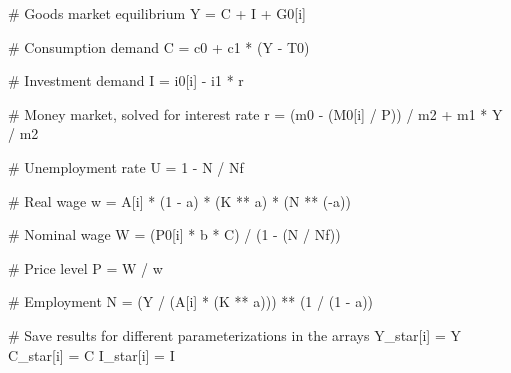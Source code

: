\documentclass[
  letterpaper,
  DIV=11,
  numbers=noendperiod]{scrreprt}
\newenvironment{Shaded}{\begin{snugshade}}{\end{snugshade}}
\newcommand{\CommentTok}[1]{\textcolor[rgb]{0.37,0.37,0.37}{#1}}
\newcommand{\DecValTok}[1]{\textcolor[rgb]{0.68,0.00,0.00}{#1}}
\newcommand{\NormalTok}[1]{\textcolor[rgb]{0.00,0.23,0.31}{#1}}
\newcommand{\OperatorTok}[1]{\textcolor[rgb]{0.37,0.37,0.37}{#1}}
\begin{document}
\begin{tcolorbox}
\begin{Shaded}
\begin{Highlighting}[]
        \CommentTok{\# Goods market equilibrium}
\NormalTok{        Y }\OperatorTok{=}\NormalTok{ C }\OperatorTok{+}\NormalTok{ I }\OperatorTok{+}\NormalTok{ G0[i]}

        \CommentTok{\# Consumption demand}
\NormalTok{        C }\OperatorTok{=}\NormalTok{ c0 }\OperatorTok{+}\NormalTok{ c1 }\OperatorTok{*}\NormalTok{ (Y }\OperatorTok{{-}}\NormalTok{ T0)}

        \CommentTok{\# Investment demand}
\NormalTok{        I }\OperatorTok{=}\NormalTok{ i0[i] }\OperatorTok{{-}}\NormalTok{ i1 }\OperatorTok{*}\NormalTok{ r}

        \CommentTok{\# Money market, solved for interest rate}
\NormalTok{        r }\OperatorTok{=}\NormalTok{ (m0 }\OperatorTok{{-}}\NormalTok{ (M0[i] }\OperatorTok{/}\NormalTok{ P)) }\OperatorTok{/}\NormalTok{ m2 }\OperatorTok{+}\NormalTok{ m1 }\OperatorTok{*}\NormalTok{ Y }\OperatorTok{/}\NormalTok{ m2}

        \CommentTok{\# Unemployment rate}
\NormalTok{        U }\OperatorTok{=} \DecValTok{1} \OperatorTok{{-}}\NormalTok{ N }\OperatorTok{/}\NormalTok{ Nf}

        \CommentTok{\# Real wage}
\NormalTok{        w }\OperatorTok{=}\NormalTok{ A[i] }\OperatorTok{*}\NormalTok{ (}\DecValTok{1} \OperatorTok{{-}}\NormalTok{ a) }\OperatorTok{*}\NormalTok{ (K }\OperatorTok{**}\NormalTok{ a) }\OperatorTok{*}\NormalTok{ (N }\OperatorTok{**}\NormalTok{ (}\OperatorTok{{-}}\NormalTok{a))}

        \CommentTok{\# Nominal wage}
\NormalTok{        W }\OperatorTok{=}\NormalTok{ (P0[i] }\OperatorTok{*}\NormalTok{ b }\OperatorTok{*}\NormalTok{ C) }\OperatorTok{/}\NormalTok{ (}\DecValTok{1} \OperatorTok{{-}}\NormalTok{ (N }\OperatorTok{/}\NormalTok{ Nf))}

        \CommentTok{\# Price level}
\NormalTok{        P }\OperatorTok{=}\NormalTok{ W }\OperatorTok{/}\NormalTok{ w}

        \CommentTok{\# Employment}
\NormalTok{        N }\OperatorTok{=}\NormalTok{ (Y }\OperatorTok{/}\NormalTok{ (A[i] }\OperatorTok{*}\NormalTok{ (K }\OperatorTok{**}\NormalTok{ a))) }\OperatorTok{**}\NormalTok{ (}\DecValTok{1} \OperatorTok{/}\NormalTok{ (}\DecValTok{1} \OperatorTok{{-}}\NormalTok{ a))}

    \CommentTok{\# Save results for different parameterizations in the arrays}
\NormalTok{    Y\_star[i] }\OperatorTok{=}\NormalTok{ Y}
\NormalTok{    C\_star[i] }\OperatorTok{=}\NormalTok{ C}
\NormalTok{    I\_star[i] }\OperatorTok{=}\NormalTok{ I}
\end{Highlighting}
\end{Shaded}

\end{tcolorbox}
\end{document}

